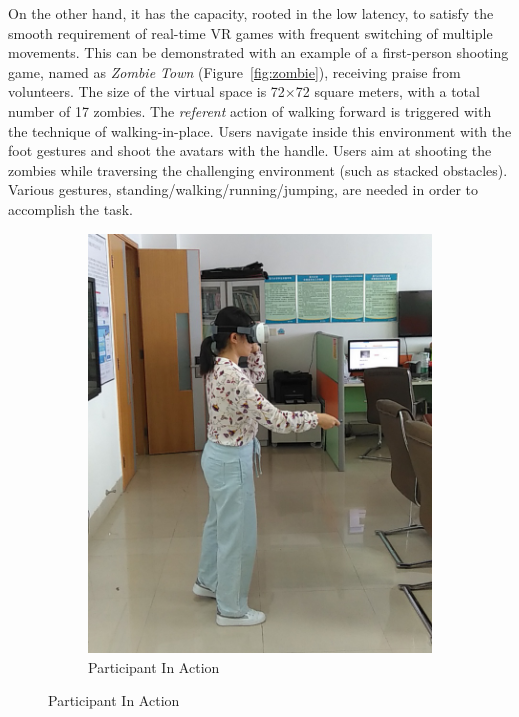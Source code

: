 \documentclass[review]{vgtc}                 %
\begin{document}
On the other hand, it has the capacity, rooted in the low latency, to satisfy the smooth requirement of real-time VR games with frequent switching of multiple movements. This can be demonstrated with an example of a first-person shooting game, named as \emph{Zombie Town} (Figure~\ref{fig:zombie}), receiving praise from volunteers. The size of the virtual space is 72$\times$72 square meters, with a total number of 17 zombies. 
The \emph{referent} action of walking forward is triggered with the technique of walking-in-place.
Users navigate inside this environment with the foot gestures and shoot the avatars with the handle. 
Users aim at shooting the zombies while traversing the challenging environment (such as stacked obstacles).
Various gestures, standing/walking/running/jumping, are needed in order to accomplish the task. 
\begin{figure}[h]
	\centering
	\begin{subfigure}{0.47\linewidth}
		\centering
		\includegraphics[width=\linewidth]{./figs/zombie_real.jpg}
		\caption[]{\label{fig:zombie_real} Participant In Action
		}
	\end{subfigure}

\end{figure}
\end{document}
